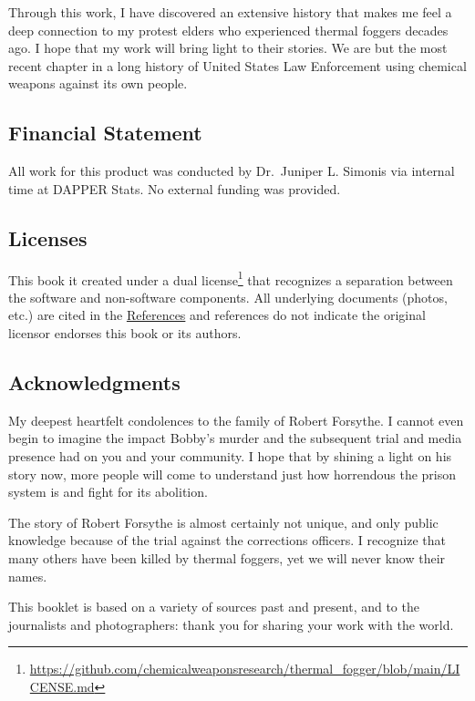 \documentclass[
  11pt,
]{krantz}
\renewcommand{\href}[2]{#2\footnote{\url{#1}}}
\begin{document}
Through this work, I have discovered an extensive history that makes me feel a deep connection to my protest elders who experienced thermal foggers decades ago.
I hope that my work will bring light to their stories.
We are but the most recent chapter in a long history of United States Law Enforcement using chemical weapons against its own people.

\hypertarget{financial-statement}{%
\subsection*{Financial Statement}\label{financial-statement}}


All work for this product was conducted by Dr.~Juniper L. Simonis via internal time at DAPPER Stats.
No external funding was provided.

\hypertarget{licenses}{%
\subsection*{Licenses}\label{licenses}}


This book it created under a \href{https://github.com/chemicalweaponsresearch/thermal_fogger/blob/main/LICENSE.md}{dual license} that recognizes a separation between the software and non-software components.
All underlying documents (photos, etc.) are cited in the \protect\hyperlink{References}{References} and references do not indicate the original licensor endorses this book or its authors.

\hypertarget{acknowledgments}{%
\subsection*{Acknowledgments}\label{acknowledgments}}


My deepest heartfelt condolences to the family of Robert Forsythe.
I cannot even begin to imagine the impact Bobby's murder and the subsequent trial and media presence had on you and your community.
I hope that by shining a light on his story now, more people will come to understand just how horrendous the prison system is and fight for its abolition.

The story of Robert Forsythe is almost certainly not unique, and only public knowledge because of the trial against the corrections officers.
I recognize that many others have been killed by thermal foggers, yet we will never know their names.

This booklet is based on a variety of sources past and present, and to the journalists and photographers: thank you for sharing your work with the world.
\end{document}
